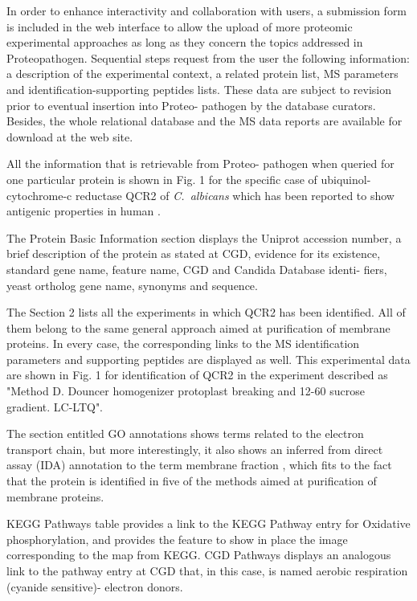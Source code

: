 In order to enhance interactivity and collaboration
with users, a submission form is included in the web
interface to allow the upload of more proteomic experimental
 approaches as long as they concern the topics
addressed in Proteopathogen. Sequential steps request from
the user the following information: a description of the
experimental context, a related protein list, MS parameters
and identification-supporting peptides lists. These data are
subject to revision prior to eventual insertion into Proteo-
pathogen by the database curators. Besides, the whole relational
 database and the MS data reports are available for
download at the web site.

All the information that is retrievable from Proteo-
pathogen when queried for one particular protein is shown
in Fig. 1 for the specific case of ubiquinol-cytochrome-c
reductase QCR2 of \textit{\mbox{C. albicans}} which has been reported to
show antigenic properties in human \citep{Pitarch2004}.

The Protein Basic Information section displays the
Uniprot accession number, a brief description of the protein
as stated at CGD, evidence for its existence, standard gene
name, feature name, CGD and Candida Database identi-
fiers, yeast ortholog gene name, synonyms and sequence.

The Section 2 lists all the experiments in which QCR2
has been identified. All of them belong to the same general
approach aimed at purification of membrane proteins. In
every case, the corresponding links to the MS identification
parameters and supporting peptides are displayed as well.
This experimental data are shown in Fig. 1 for identification
of QCR2 in the experiment described as "Method D.
Douncer homogenizer protoplast breaking and 12-60%
sucrose gradient. LC-LTQ".

The section entitled GO annotations shows terms related
to the electron transport chain, but more interestingly, it
also shows an inferred from direct assay (IDA) annotation to
the term membrane fraction \citep{Insenser2006}, which fits to the fact that
the protein is identified in five of the methods aimed at
purification of membrane proteins.

KEGG Pathways table provides a link to the KEGG
Pathway entry for Oxidative phosphorylation, and provides
the feature to show in place the image corresponding to the
map from KEGG. CGD Pathways displays an analogous link
to the pathway entry at CGD that, in this case, is named
aerobic respiration (cyanide sensitive)- electron donors.

